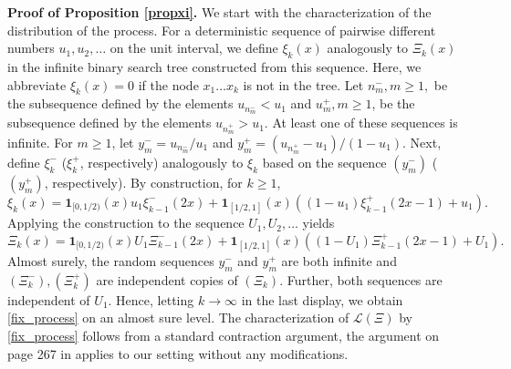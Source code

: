 \documentclass{amsart}       %
\newcommand{\I}[1]{\ensuremath{\mathbf{1}_{  #1  }}}
\newcommand{\Law}{\mathcal{L}}
\begin{document}
\medskip \textbf{Proof of Proposition \ref{propxi}.}
We start with the characterization of the distribution of the process. For a deterministic sequence of pairwise different numbers $u_1, u_2, \ldots$ on the unit interval, we define $\xi_k(x)$ analogously to $\Xi_k(x)$ in the infinite binary search tree constructed from this sequence. Here, we abbreviate $\xi_k(x) = 0$ if the node
$x_1 \ldots x_k$ is not in the tree. 
Let $n_m^-, m \geq 1,$ be the subsequence defined by the elements $u_{n^-_m} < u_1$ and $u_m^+, m \geq 1$, be the subsequence defined by the elements $u_{n^+_m} > u_1$. At least one of these sequences is infinite. For $m \geq 1$, let
$y_m^{-} = u_{n^{-}_m} / u_1$ and $y_m^+ = (u_{n^+_m} - u_1) / (1-u_1)$. Next, define $\xi^{-}_k$ ($\xi^+_k$, respectively) analogously to $\xi_k$ based on the sequence $(y^-_m)$ ($(y^+_m)$, respectively). By construction, for $k \geq 1$,  $$\xi_k(x) = \I{[0,1/2)}(x) u_1 \xi_{k-1}^-(2x) + \I{[1/2,1]}(x) ((1-u_1) \xi_{k-1}^+(2x - 1) + u_1).$$
Applying the construction to the sequence $U_1, U_2, \ldots$ yields
$$\Xi_k(x) = \I{[0,1/2)}(x) U_1 \Xi_{k-1}^-(2x) + \I{[1/2,1]}(x) ((1-U_1) \Xi_{k-1}^+(2x - 1) + U_1).$$
Almost surely, the random sequences $y_m^{-}$ and $y_m^+$ are both infinite and $(\Xi^-_k), (\Xi^+_k)$ are independent copies of $(\Xi_k)$. Further, both 
sequences are independent of $U_1$. Hence, letting $k \to \infty$ in the last display, we obtain \eqref{fix_process} on an almost sure level. The characterization of 
$\Law(\Xi)$ by \eqref{fix_process} follows from a standard contraction argument, the argument on page 267 in \cite{grro} applies to our setting without any modifications.
\end{document}
